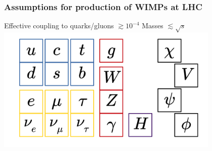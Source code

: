 \documentclass[aspectratio=169,xcolor=dvipsnames,,table,compress]{beamer}
\begin{document}
\begin{frame} \frametitle{Assumptions for production of WIMPs at LHC}
  \vspace{-5mm}
  \centering 
     Effective coupling to quarks/gluons $\gtrsim 10^{-4}$ \hspace{20mm}
    Masses $\lesssim \sqrt{s}$ \\ 
    \includegraphics[width=0.8\textwidth]{../figures/talk/dm_fields.pdf}
\end{frame}
\end{document}
